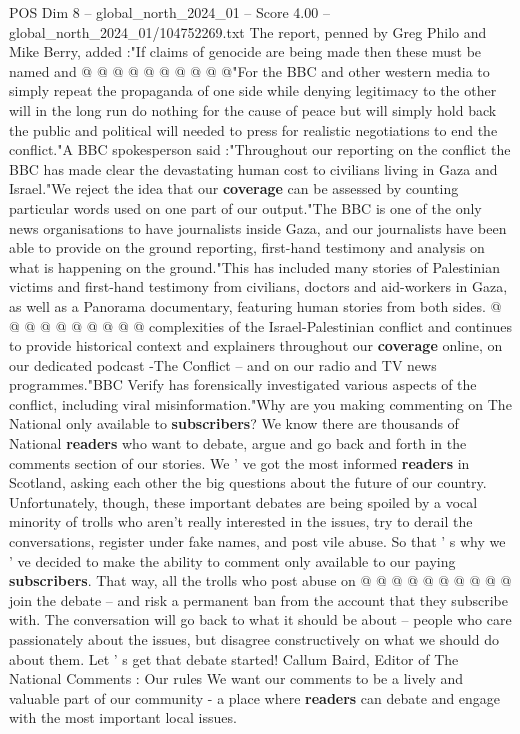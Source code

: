 \begin{textsample}{POS Dim 8 – global\_north\_2024\_01 – Score 4.00 – global\_north\_2024\_01/104752269.txt}
The report, penned by Greg Philo and Mike Berry, added :"If claims of genocide are being made then these must be named and @ @ @ @ @ @ @ @ @ @"For the BBC and other western media to simply repeat the propaganda of one side while denying legitimacy to the other will in the long run do nothing for the cause of peace but will simply hold back the public and political will needed to press for realistic negotiations to end the conflict."A BBC spokesperson said :"Throughout our reporting on the conflict the BBC has made clear the devastating human cost to civilians living in Gaza and Israel."We reject the idea that our \textbf{coverage} can be assessed by counting particular words used on one part of our output."The BBC is one of the only news organisations to have journalists inside Gaza, and our journalists have been able to provide on the ground reporting, first-hand testimony and analysis on what is happening on the ground."This has included many stories of Palestinian victims and first-hand testimony from civilians, doctors and aid-workers in Gaza, as well as a Panorama documentary, featuring human stories from both sides. @ @ @ @ @ @ @ @ @ @ complexities of the Israel-Palestinian conflict and continues to provide historical context and explainers throughout our \textbf{coverage} online, on our dedicated podcast -The Conflict -- and on our radio and TV news programmes."BBC Verify has forensically investigated various aspects of the conflict, including viral misinformation."Why are you making commenting on The National only available to \textbf{subscribers}?
We know there are thousands of National \textbf{readers} who want to debate, argue and go back and forth in the comments section of our stories.
We ' ve got the most informed \textbf{readers} in Scotland, asking each other the big questions about the future of our country.
Unfortunately, though, these important debates are being spoiled by a vocal minority of trolls who aren't really interested in the issues, try to derail the conversations, register under fake names, and post vile abuse.
So that ' s why we ' ve decided to make the ability to comment only available to our paying \textbf{subscribers}.
That way, all the trolls who post abuse on @ @ @ @ @ @ @ @ @ @ join the debate -- and risk a permanent ban from the account that they subscribe with.
The conversation will go back to what it should be about -- people who care passionately about the issues, but disagree constructively on what we should do about them.
Let ' s get that debate started!
Callum Baird, Editor of The National Comments : Our rules We want our comments to be a lively and valuable part of our community - a place where \textbf{readers} can debate and engage with the most important local issues.

\end{textsample}
